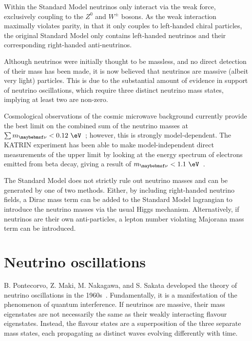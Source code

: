 Within the Standard Model neutrinos only interact via the weak force, exclusively coupling to the
$Z^{0}$ and $W^{\pm}$ bosons. As the weak interaction maximally violates parity, in that it only
couples to left-handed chiral particles, the original Standard Model only contains left-handed
neutrinos and their corresponding right-handed anti-neutrinos.

Although neutrinos were initially thought to be massless, and no direct detection of their mass
has been made, it is now believed that neutrinos are massive (albeit very light) particles. This
is due to the substantial amount of evidence in support of neutrino oscillations, which require
three distinct neutrino mass states, implying at least two are non-zero.

Cosmological observations of the cosmic microwave background currently provide the best limit on
the combined sum of the neutrino masses at $\sum m_{\nu} < 0.12~\eV$~\cite{planck2018}; however,
this is strongly model-dependent. The KATRIN experiment has been able to make model-independent
direct measurements of the upper limit by looking at the energy spectrum of electrons emitted from
beta decay, giving a result of $m_{\nu} < 1.1~\eV$~\cite{aker2019}.

The Standard Model does not strictly rule out neutrino masses and can be generated by one of two
methods. Either, by including right-handed neutrino fields, a Dirac mass term can be added to the
Standard Model lagrangian to introduce the neutrino masses via the usual Higgs mechanism.
Alternatively, if neutrinos are their own anti-particles, a lepton number violating Majorana mass
term can be introduced.

\section{Neutrino oscillations} %
\label{sec:theory_oscillations} %

B. Pontecorvo, Z. Maki, M. Nakagawa, and S. Sakata developed the theory of neutrino oscillations
in the 1960s~\cite{maki1962, pontecorvo1967, pontecorvo1969}. Fundamentally, it is a manifestation
of the phenomenon of quantum interference. If neutrinos are massive, their mass eigenstates are
not necessarily the same as their weakly interacting flavour eigenstates. Instead, the flavour
states are a superposition of the three separate mass states, each propagating as distinct waves
evolving differently with time.

